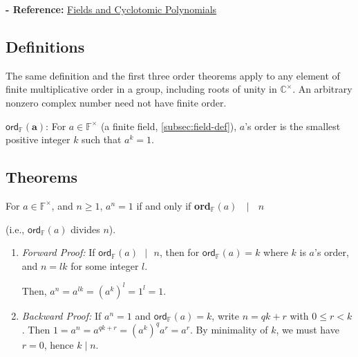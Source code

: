 \textbf{- Reference:} 
\href{https://e.math.cornell.edu/people/belk/numbertheory/CyclotomicPolynomials.pdf}{Fields and Cyclotomic Polynomials}~\cite{cyclotomic-polynomial}

\subsection{Definitions}
\label{subsec:order-def}

The same definition and the first three order theorems apply to any element of finite multiplicative order in a group, including roots of unity in $\mathbb{C}^{\times}$. An arbitrary nonzero complex number need not have finite order.

\begin{tcolorbox}[title={\textbf{\tboxdef{\ref*{subsec:order-def}} Order Definition}}]
$\bm{\textsf{ord}_{\mathbb{F}}(a)}$: For $a \in \mathbb{F}^{\times}$ (a finite field, \autoref{subsec:field-def}), $a$'s order is the smallest positive integer $k$ such that $a^k = 1$. 
\end{tcolorbox}

\subsection{Theorems}
\label{subsec:order-theorem}



\begin{tcolorbox}[title={\textbf{\tboxtheorem{\ref*{subsec:order-theorem}.1} Order Property (I)}}]
For $a \in \mathbb{F}^{\times}$, and $n \geq 1$, $a^n = 1$ if and only if \textbf{\textsf{ord}}$_{\mathbb{F}}(a) \text{ } \mid \text{ } n$

(i.e., $\textsf{ord}_{\mathbb{F}}(a)$ divides $n$).
\end{tcolorbox}

\begin{myproof}
    \begin{enumerate}
    \item \textit{Forward Proof:} If $\textsf{ord}_{\mathbb{F}}(a) \text{ } | \text{ } n$, then for $\textsf{ord}_{\mathbb{F}}(a) = k$ where $k$ is $a$'s order, and $n = lk$ for some integer $l$. 
    
    Then, $a^n = a^{lk} = (a^k)^l = 1^l = 1$.
    \item \textit{Backward Proof:} If $a^n = 1$ and $\textsf{ord}_{\mathbb{F}}(a)=k$, write $n=qk+r$ with $0 \le r < k$. Then $1=a^n=a^{qk+r}=(a^k)^q a^r=a^r$. By minimality of $k$, we must have $r=0$, hence $k \mid n$.
    \end{enumerate}
\end{myproof}


